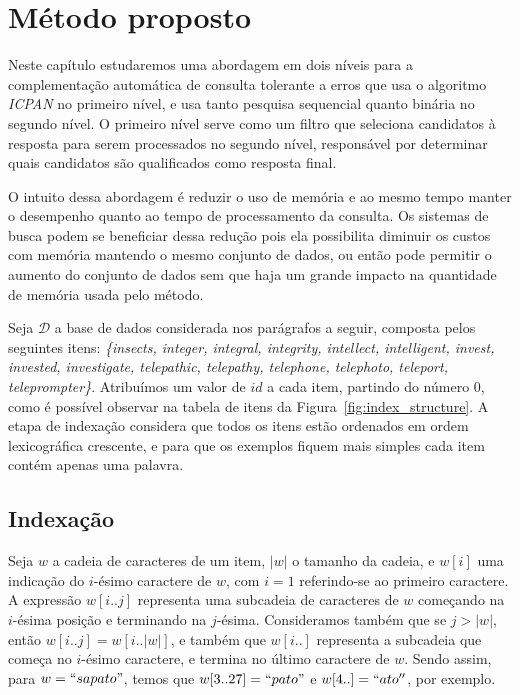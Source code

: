 \chapter{Método proposto} 
\label{sec:metodo}

Neste capítulo estudaremos uma abordagem em dois níveis para a complementação automática de consulta tolerante a erros que usa o algoritmo \textit{ICPAN} no primeiro nível, e usa tanto pesquisa sequencial quanto binária no segundo nível. O primeiro nível serve como um filtro que seleciona candidatos à resposta para serem processados no segundo nível, responsável por determinar quais candidatos são qualificados como resposta final.

O intuito dessa abordagem é reduzir o uso de memória e ao mesmo tempo manter o desempenho quanto ao tempo de processamento da consulta. Os sistemas de busca podem se beneficiar dessa redução pois ela possibilita diminuir os custos com memória mantendo o mesmo conjunto de dados, ou então pode permitir o aumento do conjunto de dados sem que haja um grande impacto na quantidade de memória usada pelo método.

Seja $\mathcal{D}$ a base de dados considerada nos parágrafos a seguir, composta pelos seguintes itens: \textit{\{insects, integer, integral, integrity, intellect, intelligent, invest, invested, investigate, telepathic, telepathy, telephone, telephoto, teleport, teleprompter\}}. Atribuímos um valor de $id$ a cada item, partindo do número $0$, como é possível observar na tabela de itens da Figura~\ref{fig:index_structure}. A etapa de indexação considera que todos os itens estão ordenados em ordem lexicográfica crescente, e para que os exemplos fiquem mais simples cada item contém apenas uma palavra.
 
\section{Indexação} 
\label{sec:indexing}
Seja $w$ a cadeia de caracteres de um item, $|w|$ o tamanho da cadeia, e $w[i]$ uma indicação do $i$-ésimo caractere de $w$, com $i=1$ referindo-se ao primeiro caractere. A expressão $w[i..j]$ representa uma subcadeia de caracteres de $w$ começando na $i$-ésima posição e terminando na $j$-ésima. Consideramos também que se $j > |w|$, então $w[i..j] = w[i..|w|]$, e também que $w[i..]$ representa a subcadeia que começa no $i$-ésimo caractere, e termina no último caractere de $w$. Sendo assim, para $w = ``sapato"$, temos que $w[3..27] =  ``pato"$ e $w[4..] = ``ato''$, por exemplo.  


